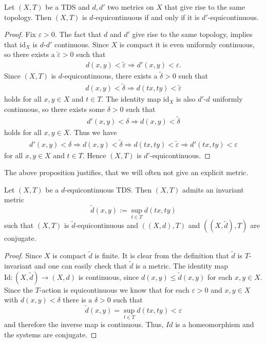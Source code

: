 \begin{proposition}
	Let $(X, T)$ be a TDS and $d, d'$ two metrics on $X$ that give rise to the same topology. Then $(X, T)$ is $d$-equicontinuous if and only if it is $d'$-equicontinuous.
	\label{prop:metricindipendent}
\end{proposition}
\begin{proof}
	Fix $\varepsilon > 0$. The fact that $d$ and $d'$ give rise to the same topology, implies that $\mathrm{id}_X$ is $d$-$d'$ continuous. Since $X$ is compact it is even uniformly continuous, so there exists a $\tilde{\varepsilon} > 0$ such that
	\begin{align*}
		d(x, y) < \tilde{\varepsilon} \Rightarrow d'(x, y) < \varepsilon.
	\end{align*}
	Since $(X, T)$ is $d$-equicontinuous, there exists a $\tilde{\delta} > 0$ such that
	\begin{align*}
		d(x, y) < \tilde{\delta} \Rightarrow d(tx, ty) < \tilde{\varepsilon}
	\end{align*}
	holds for all $x, y \in X$ and $t \in T$. The identity map $\mathrm{id}_X$ is also $d'$-$d$ uniformly continuous, so there exists some $\delta > 0$ such that
	\begin{align*}
		d'(x, y) < \delta \Rightarrow d(x, y) < \tilde{\delta}
	\end{align*}
	holds for all $x, y \in X$. Thus we have
	\begin{align*}
		d'(x, y) < \delta \Rightarrow d(x, y) < \tilde{\delta} \Rightarrow d(tx, ty) < \tilde{\varepsilon} \Rightarrow d'(tx, ty) < \varepsilon
	\end{align*}
	for all $x, y \in X$ and $t \in T$. Hence $(X, T)$ is $d'$-equicontinuous.
\end{proof}

\begin{remark}
	The above proposition justifies, that we will often not give an explicit metric.
\end{remark}

\begin{lemma}
	Let $(X, T)$ be a $d$-equicontinuous TDS.
	Then $(X, T)$ admits an invariant metric
	\[ \tilde{d}(x, y) := \sup_{t \in T} d(tx, ty) \]	
	such that $(X, T)$ is $\tilde{d}$-equicontinuous
	and $((X, d), T)$ and $((X, \tilde{d}), T)$ are conjugate.
\end{lemma}

\begin{proof}
	Since $X$ is compact $\tilde{d}$ is finite.
	It is clear from the definition that $\tilde{d}$ is $T$-invariant
	and one can easily check that $\tilde{d}$ is a metric.
	The identity map $\text{Id} : (X, \tilde{d}) \to (X, d)$ is continuous,
	since $d(x, y) \leq \tilde{d}(x, y)$ for each $x, y \in X$.
	Since the $T$-action is equicontinuous we know that for each $\varepsilon > 0$ and $x, y \in X$ with $d(x, y) < \delta$ there is a $\delta >0$ such that
	\[ \tilde{d}(x, y) = \sup_{t \in T} d(tx, ty) < \varepsilon \]
	and therefore the inverse map is continuous.
	Thus, $Id$ is a homeomorphism and the systems are conjugate.
\end{proof}

